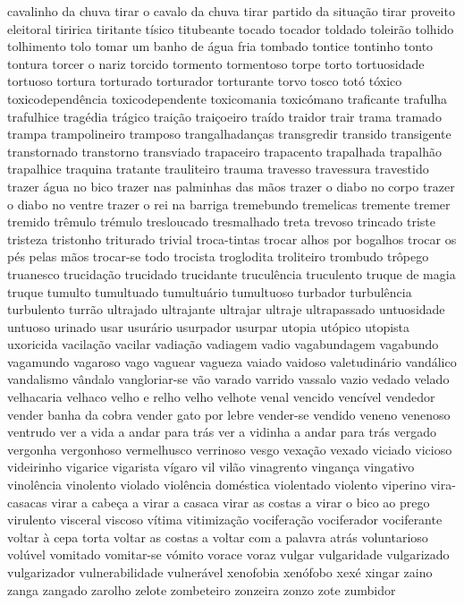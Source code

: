 cavalinho da chuva tirar o cavalo da chuva tirar partido da situa\c{c}\~ao tirar proveito eleitoral tiririca tiritante t\'{i}sico titubeante tocado tocador toldado toleir\~ao tolhido tolhimento tolo tomar um banho de \'{a}gua fria tombado tontice tontinho tonto tontura torcer o nariz torcido tormento tormentoso torpe torto tortuosidade tortuoso tortura torturado torturador torturante torvo tosco tot\'{o} t\'{o}xico toxicodepend\^{e}ncia toxicodependente toxicomania toxic\'{o}mano traficante trafulha trafulhice trag\'{e}dia tr\'{a}gico trai\c{c}\~ao trai\c{c}oeiro tra\'{i}do traidor trair trama tramado trampa trampolineiro tramposo trangalhadan\c{c}as transgredir transido transigente transtornado transtorno transviado trapaceiro trapacento trapalhada trapalh\~ao trapalhice traquina tratante trauliteiro trauma travesso travessura travestido trazer \'{a}gua no bico trazer nas palminhas das m\~aos trazer o diabo no corpo trazer o diabo no ventre trazer o rei na barriga tremebundo tremelicas tremente tremer tremido tr\^{e}mulo tr\'{e}mulo tresloucado tresmalhado treta trevoso trincado triste tristeza tristonho triturado trivial troca-tintas trocar alhos por bogalhos trocar os p\'{e}s pelas m\~aos trocar-se todo trocista troglodita troliteiro trombudo tr\^{o}pego truanesco trucida\c{c}\~ao trucidado trucidante trucul\^{e}ncia truculento truque de magia truque tumulto tumultuado tumultu\'{a}rio tumultuoso turbador turbul\^{e}ncia turbulento turr\~ao ultrajado ultrajante ultrajar ultraje ultrapassado untuosidade untuoso urinado usar usur\'{a}rio usurpador usurpar utopia ut\'{o}pico utopista uxoricida vacila\c{c}\~ao vacilar vadia\c{c}\~ao vadiagem vadio vagabundagem vagabundo vagamundo vagaroso vago vaguear vagueza vaiado vaidoso valetudin\'{a}rio vand\'{a}lico vandalismo v\^{a}ndalo vangloriar-se v\~ao varado varrido vassalo vazio vedado velado velhacaria velhaco velho e relho velho velhote venal vencido venc\'{i}vel vendedor vender banha da cobra vender gato por lebre vender-se vendido veneno venenoso ventrudo ver a vida a andar para tr\'{a}s ver a vidinha a andar para tr\'{a}s vergado vergonha vergonhoso vermelhusco verrinoso vesgo vexa\c{c}\~ao vexado viciado vicioso videirinho vigarice vigarista v\'{i}garo vil vil\~ao vinagrento vingan\c{c}a vingativo vinol\^{e}ncia vinolento violado viol\^{e}ncia dom\'{e}stica violentado violento viperino vira-casacas virar a cabe\c{c}a a virar a casaca virar as costas a virar o bico ao prego virulento visceral viscoso v\'{i}tima vitimiza\c{c}\~ao vocifera\c{c}\~ao vociferador vociferante voltar \`{a} cepa torta voltar as costas a voltar com a palavra atr\'{a}s voluntarioso vol\'{u}vel vomitado vomitar-se v\'{o}mito vorace voraz vulgar vulgaridade vulgarizado vulgarizador vulnerabilidade vulner\'{a}vel xenofobia xen\'{o}fobo xex\'{e} xingar zaino zanga zangado zarolho zelote zombeteiro zonzeira zonzo zote zumbidor 

